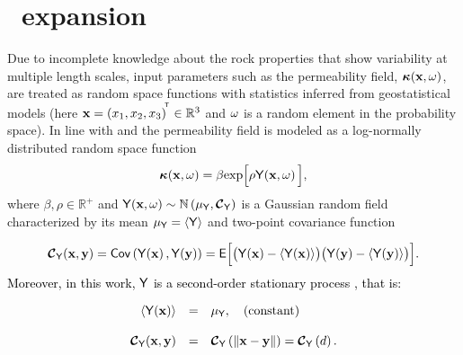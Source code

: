\section{\KL\ expansion}\label{fieldgeneratio}

Due to incomplete knowledge about the rock properties that show variability at multiple length scales, input parameters such as the permeability field, $\boldsymbol{\kappa}(\mathbf{x},\omega)$, are treated as random space functions with statistics inferred from geostatistical models (here $\mathbf{x} =\left( x_{1},x_{2},x_{3}  \right)^{\! ^{\mathsf{T}}}\in \mathbb{R}^{3}$ and $\omega$ is a random element in the probability space).
In line with \cite{dagan89} and \cite{gelhar93} the permeability field is modeled as a log-normally distributed random space function
%
\begin{equation}
  \perm\fxw = \beta\exp\Big[\rho\Y\fxw\Big],
\label{field}
\end{equation}
%
\noindent where $\beta,\rho\in\mathbb{R}^{+}$ and $\mathsf{Y}\!\left(\mathbf{x},\omega\right) \sim \mathbb{N}\left({\mu_{\mathsf{Y}}},{\boldmath{\mbox{$\mathcal{C}$}}}_{\mathsf{Y}}\right)$ is a Gaussian random field
characterized by its mean ${\mu_{\mathsf{Y}}} = \langle {\mathsf{Y}} \rangle$ and two-point covariance function

\begin{equation}
 \covv{\Y} = \covar{\Y\fx}{\Y\fy} = \mathsf{E}\Big[ \big( \Y\fx - \med{\Y\fx}  \big) \big( \Y\fy - \med{\Y\fy}  \big) \Big].
 \label{covg}
\end{equation}
%
\textcolor{black}{Moreover, in this work, $\mathsf{Y}$ is a second-order stationary process \citep{gelhar93}, that is:}

\begin{equation}
 \begin{array}{rcl}
    \langle {\mathsf{Y}\!\left(\mathbf{x}\right)} \rangle &=& {\mu_{\mathsf{Y}}},\quad \mbox{(constant)}\\ \\
    {\boldmath{\mbox{$\mathcal{C}$}}}_{\mathsf{Y}}(\mathbf{x}, \mathbf{y})   &=& {\boldmath{\mbox{$\mathcal{C}$}}}_{\mathsf{Y}}\left(\lVert \mathbf{x} - \mathbf{y} \rVert \right) = {\boldmath{\mbox{$\mathcal{C}$}}}_{\mathsf{Y}}\left(d\right).
 \end{array}
\end{equation}


